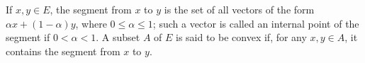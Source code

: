 If $x, y \in E$, the segment from $x$ to $y$ is the set of all vectors of the form $\alpha x + (1 - \alpha) y$, where $0 \leq \alpha \leq 1$; such a vector is called an internal point of the segment if $0 < \alpha < 1$. A subset $A$ of $E$ is said to be convex if, for any $x, y \in A$, it contains the segment from $x$ to $y$.